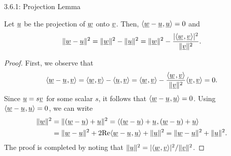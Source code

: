\documentclass[10pt,letterpaper,english]{beamer}
\begin{document}
\begin{frame}{3.6.1: Projection Lemma}

\begin{lemma}
Let $\underline{u}$ be the projection of $\underline{w}$ onto $\underline{v}$.
Then, ${\langle  \underline{w}-\underline{u}  \mskip1mu ,  \underline{u}  \rangle} = 0$ and \vspace{-1mm}
\[ \|\underline{w}-\underline{u}\|^2 =  \|\underline{w}\|^2 - \| \underline{u} \|^2 = \|\underline{w}\|^2 - \frac{|{\langle  \underline{w}  \mskip1mu ,  \underline{v}  \rangle}|^2}{\|\underline{v}\|^2}. \]
\end{lemma}
\begin{proof}
First, we observe that \vspace{-1mm}
\[ \tinner{ \vecnot{w} - \vecnot{u} }{ \vecnot{v} } = \tinner{ \vecnot{w} }{ \vecnot{v} } - \tinner{ \vecnot{u} }{ \vecnot{v} } = \tinner{ \vecnot{w} }{ \vecnot{v} } - \frac{\inner{ \vecnot{w} }{ \vecnot{v} }}{\|\vecnot{v}\|^2} \tinner{ \vecnot{v} }{ \vecnot{v} } = 0. \vspace{-1.5mm} \]
Since $\underline{u} = s \underline{v}$ for some scalar $s$, it follows that ${\langle  \underline{w}-\underline{u}  \mskip1mu ,  \underline{u}  \rangle} =  0$.
Using ${\langle  \underline{w}-\underline{u}  \mskip1mu ,  \underline{u}  \rangle} = 0$, we can write \vspace{-1mm}
\begin{align*}
\|\vecnot{w}\|^2 &= \|(\vecnot{w}-\vecnot{u})+\vecnot{u}\|^2
= \tinner{ (\vecnot{w}-\vecnot{u})+\vecnot{u}}{(\vecnot{w}-\vecnot{u})+\vecnot{u}} \\
&= \|\vecnot{w}-\vecnot{u}\|^2 + 2 \Real \tinner{ \vecnot{w}-\vecnot{u} }{ \vecnot{u} } + \|\vecnot{u}\|^2
= \|\vecnot{w}-\vecnot{u}\|^2 + \|\vecnot{u}\|^2. \vspace{-1mm}
\end{align*}
The proof is completed by noting that $\|\underline{u}\|^2 = |{\langle  \underline{w}  \mskip1mu ,  \underline{v}  \rangle}|^2 / \|\underline{v}\|^2$.
\end{proof}

\end{frame}
\end{document}
